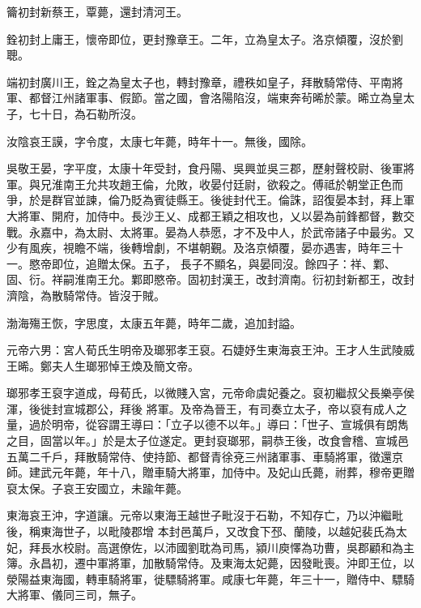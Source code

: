 \begin{pinyinscope}
 籥初封新蔡王，覃薨，還封清河王。



 銓初封上庸王，懷帝即位，更封豫章王。二年，立為皇太子。洛京傾覆，沒於劉聰。



 端初封廣川王，銓之為皇太子也，轉封豫章，禮秩如皇子，拜散騎常侍、平南將軍、都督江州諸軍事、假節。當之國，會洛陽陷沒，端東奔茍晞於蒙。晞立為皇太子，七十日，為石勒所沒。



 汝陰哀王謨，字令度，太康七年薨，時年十一。無後，國除。



 吳敬王晏，字平度，太康十年受封，食丹陽、吳興並吳三郡，歷射聲校尉、後軍將軍。與兄淮南王允共攻趙王倫，允敗，收晏付廷尉，欲殺之。傅祗於朝堂正色而爭，於是群官並諫，倫乃貶為賓徒縣王。後徙封代王。倫誅，詔復晏本封，拜上軍大將軍、開府，加侍中。長沙王乂、成都王穎之相攻也，乂以晏為前鋒都督，數交戰。永嘉中，為太尉、太將軍。晏為人恭愿，才不及中人，於武帝諸子中最劣。又少有風疾，視瞻不端，後轉增劇，不堪朝覲。及洛京傾覆，晏亦遇害，時年三十一。愍帝即位，追贈太保。五子，
 長子不顯名，與晏同沒。餘四子：祥、鄴、固、衍。祥嗣淮南王允。鄴即愍帝。固初封漢王，改封濟南。衍初封新都王，改封濟陰，為散騎常侍。皆沒于賊。



 渤海殤王恢，字思度，太康五年薨，時年二歲，追加封謚。



 元帝六男：宮人荀氏生明帝及瑯邪孝王裒。石婕妤生東海哀王沖。王才人生武陵威王晞。鄭夫人生瑯邪悼王煥及簡文帝。



 瑯邪孝王裒字道成，母荀氏，以微賤入宮，元帝命虞妃養之。裒初繼叔父長樂亭侯渾，後徙封宣城郡公，拜後
 將軍。及帝為晉王，有司奏立太子，帝以裒有成人之量，過於明帝，從容謂王導曰：「立子以德不以年。」導曰：「世子、宣城俱有朗雋之目，固當以年。」於是太子位遂定。更封裒瑯邪，嗣恭王後，改食會稽、宣城邑五萬二千戶，拜散騎常侍、使持節、都督青徐兗三州諸軍事、車騎將軍，徵還京師。建武元年薨，年十八，贈車騎大將軍，加侍中。及妃山氏薨，祔葬，穆帝更贈裒太保。子哀王安國立，未踰年薨。



 東海哀王沖，字道讓。元帝以東海王越世子毗沒于石勒，不知存亡，乃以沖繼毗後，稱東海世子，以毗陵郡增
 本封邑萬戶，又改食下邳、蘭陵，以越妃裴氏為太妃，拜長水校尉。高選僚佐，以沛國劉耽為司馬，潁川庾懌為功曹，吳郡顧和為主簿。永昌初，遷中軍將軍，加散騎常侍。及東海太妃薨，因發毗喪。沖即王位，以滎陽益東海國，轉車騎將軍，徙驃騎將軍。咸康七年薨，年三十一，贈侍中、驃騎大將軍、儀同三司，無子。




\end{pinyinscope}

